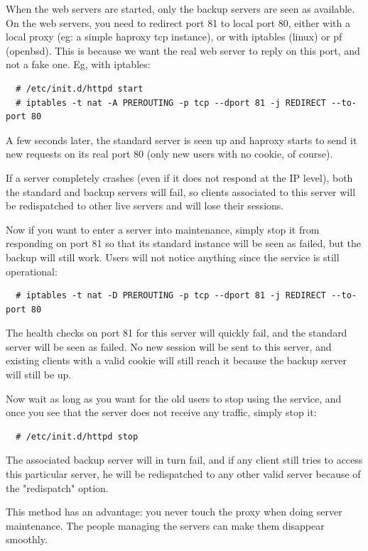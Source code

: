When the web servers are started, only the backup servers are seen as
available. On the web servers, you need to redirect port 81 to local
port 80, either with a local proxy (eg: a simple haproxy tcp instance),
or with iptables (linux) or pf (openbsd). This is because we want the
real web server to reply on this port, and not a fake one. Eg, with
iptables:

\begin{verbatim}
  # /etc/init.d/httpd start
  # iptables -t nat -A PREROUTING -p tcp --dport 81 -j REDIRECT --to-port 80
\end{verbatim}

A few seconds later, the standard server is seen up and haproxy starts to send
it new requests on its real port 80 (only new users with no cookie, of course).

If a server completely crashes (even if it does not respond at the IP level),
both the standard and backup servers will fail, so clients associated to this
server will be redispatched to other live servers and will lose their sessions.

Now if you want to enter a server into maintenance, simply stop it from
responding on port 81 so that its standard instance will be seen as failed,
but the backup will still work. Users will not notice anything since the
service is still operational:

\begin{verbatim}
  # iptables -t nat -D PREROUTING -p tcp --dport 81 -j REDIRECT --to-port 80
\end{verbatim}

The health checks on port 81 for this server will quickly fail, and the
standard server will be seen as failed. No new session will be sent to this
server, and existing clients with a valid cookie will still reach it because
the backup server will still be up.

Now wait as long as you want for the old users to stop using the service, and
once you see that the server does not receive any traffic, simply stop it:

\begin{verbatim}
  # /etc/init.d/httpd stop
\end{verbatim}

The associated backup server will in turn fail, and if any client still tries
to access this particular server, he will be redispatched to any other valid
server because of the "redispatch" option.

This method has an advantage: you never touch the proxy when doing server
maintenance. The people managing the servers can make them disappear smoothly.


